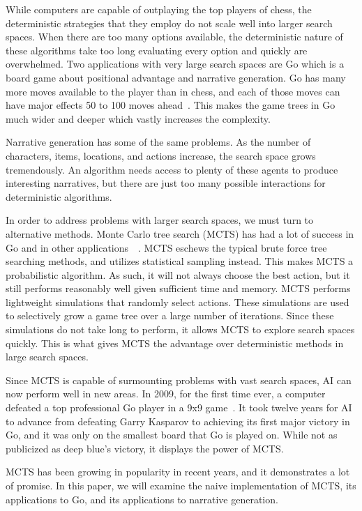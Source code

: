 \documentclass{sig-alternate}
\begin{document}
While computers are capable of outplaying the top players of chess, the deterministic strategies that they employ do not scale well into larger search spaces. When there are too many options available, the deterministic nature of these algorithms take too long evaluating every option and quickly are overwhelmed. Two applications with very large search spaces are Go which is a board game about positional advantage and narrative generation. Go has many more moves available to the player than in chess, and each of those moves can have major effects 50 to 100 moves ahead~\cite{RAVEinGo}. This makes the game trees in Go much wider and deeper which vastly increases the complexity. 

Narrative generation has some of the same problems. As the number of characters, items, locations, and actions increase, the search space grows tremendously. An algorithm needs access to plenty of these agents to produce interesting narratives, but there are just too many possible interactions for deterministic algorithms.

In order to address problems with larger search spaces, we must turn to alternative methods. Monte Carlo tree search (MCTS) has had a lot of success in Go and in other applications~\cite{TheGrandChallenge}~\cite{ActionSelection}. MCTS eschews the typical brute force tree searching methods, and utilizes statistical sampling instead. This makes MCTS a probabilistic algorithm. As such, it will not always choose the best action, but it still performs reasonably well given sufficient time and memory. MCTS performs lightweight simulations that randomly select actions. These simulations are used to selectively grow a game tree over a large number of iterations. Since these simulations do not take long to perform, it allows MCTS to explore search spaces quickly. This is what gives MCTS the advantage over deterministic methods in large search spaces.

Since MCTS is capable of surmounting problems with vast search spaces, AI can now perform well in new areas. In 2009, for the first time ever, a computer defeated a top professional Go player in a 9x9 game~\cite{TheGrandChallenge}. It took twelve years for AI to advance from defeating Garry Kasparov to achieving its first major victory in Go, and it was only on the smallest board that Go is played on. While not as publicized as deep blue's victory, it displays the power of MCTS.

MCTS has been growing in popularity in recent years, and it demonstrates a lot of promise. In this paper, we will examine the naive implementation of MCTS, its applications to Go, and its applications to narrative generation.  
\end{document}
